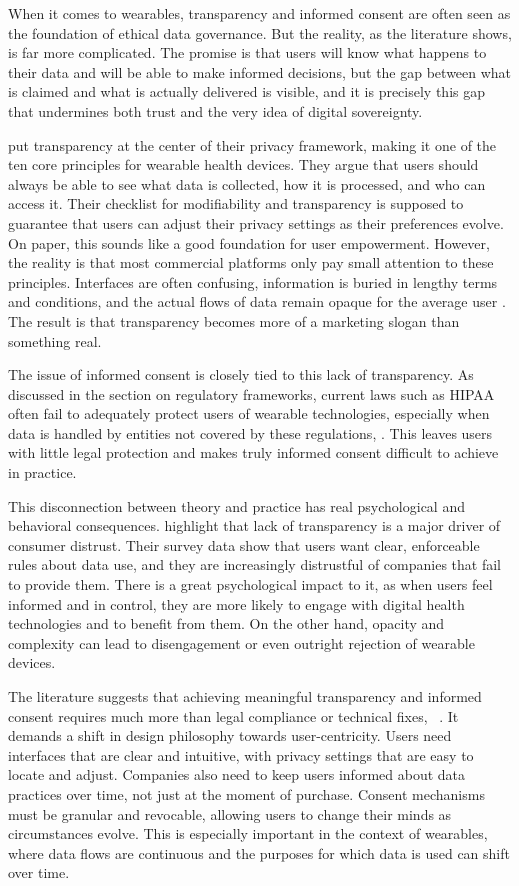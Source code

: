 	When it comes to wearables, transparency and informed consent are often seen as the foundation of ethical data governance. But the reality, as the literature shows, is far more complicated. The promise is that users will know what happens to their data and will be able to make informed decisions, but the gap between what is claimed and what is actually delivered is visible, and it is precisely this gap that undermines both trust and the very idea of digital sovereignty.

	\cite{Safavi2014} put transparency at the center of their privacy framework, making it one of the ten core principles for wearable health devices. They argue that users should always be able to see what data is collected, how it is processed, and who can access it. Their checklist for modifiability and transparency is supposed to guarantee that users can adjust their privacy settings as their preferences evolve. On paper, this sounds like a good foundation for user empowerment. However, the reality is that most commercial platforms only pay small attention to these principles. Interfaces are often confusing, information is buried in lengthy terms and conditions, and the actual flows of data remain opaque for the average user \cite{Sui2023}. The result is that transparency becomes more of a marketing slogan than something real.

	The issue of informed consent is closely tied to this lack of transparency. As discussed in the section on regulatory frameworks, current laws such as HIPAA often fail to adequately protect users of wearable technologies, especially when data is handled by entities not covered by these regulations, \cite{Banerjee2018}. This leaves users with little legal protection and makes truly informed consent difficult to achieve in practice.

	This disconnection between theory and practice has real psychological and behavioral consequences. \cite{Arbanas2023} highlight that lack of transparency is a major driver of consumer distrust. Their survey data show that users want clear, enforceable rules about data use, and they are increasingly distrustful of companies that fail to provide them. There is a great psychological impact to it, as when users feel informed and in control, they are more likely to engage with digital health technologies and to benefit from them. On the other hand, opacity and complexity can lead to disengagement or even outright rejection of wearable devices.

	The literature suggests that achieving meaningful transparency and informed consent requires much more than legal compliance or technical fixes, ~\cite{Safavi2014}. It demands a shift in design philosophy towards user-centricity. Users need interfaces that are clear and intuitive, with privacy settings that are easy to locate and adjust. Companies also need to keep users informed about data practices over time, not just at the moment of purchase. Consent mechanisms must be granular and revocable, allowing users to change their minds as circumstances evolve. This is especially important in the context of wearables, where data flows are continuous and the purposes for which data is used can shift over time.

